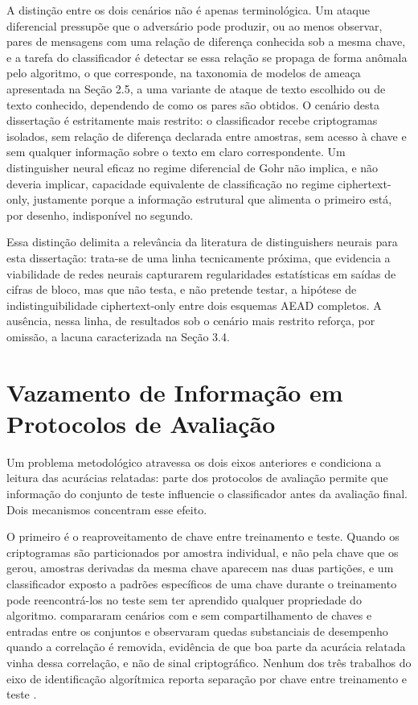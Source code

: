 A distinção entre os dois cenários não é apenas terminológica. Um ataque diferencial pressupõe que o adversário pode produzir, ou ao menos observar, pares de mensagens com uma relação de diferença conhecida sob a mesma chave, e a tarefa do classificador é detectar se essa relação se propaga de forma anômala pelo algoritmo, o que corresponde, na taxonomia de modelos de ameaça apresentada na Seção 2.5, a uma variante de ataque de texto escolhido ou de texto conhecido, dependendo de como os pares são obtidos. O cenário desta dissertação é estritamente mais restrito: o classificador recebe criptogramas isolados, sem relação de diferença declarada entre amostras, sem acesso à chave e sem qualquer informação sobre o texto em claro correspondente. Um distinguisher neural eficaz no regime diferencial de Gohr não implica, e não deveria implicar, capacidade equivalente de classificação no regime ciphertext-only, justamente porque a informação estrutural que alimenta o primeiro está, por desenho, indisponível no segundo.

Essa distinção delimita a relevância da literatura de distinguishers neurais para esta dissertação: trata-se de uma linha tecnicamente próxima, que evidencia a viabilidade de redes neurais capturarem regularidades estatísticas em saídas de cifras de bloco, mas que não testa, e não pretende testar, a hipótese de indistinguibilidade ciphertext-only entre dois esquemas AEAD completos. A ausência, nessa linha, de resultados sob o cenário mais restrito reforça, por omissão, a lacuna caracterizada na Seção 3.4.


\section{Vazamento de Informação em Protocolos de Avaliação}

Um problema metodológico atravessa os dois eixos anteriores e condiciona a leitura das acurácias relatadas: parte dos protocolos de avaliação permite que informação do conjunto de teste influencie o classificador antes da avaliação final. Dois mecanismos concentram esse efeito.

O primeiro é o reaproveitamento de chave entre treinamento e teste. Quando os criptogramas são particionados por amostra individual, e não pela chave que os gerou, amostras derivadas da mesma chave aparecem nas duas partições, e um classificador exposto a padrões específicos de uma chave durante o treinamento pode reencontrá-los no teste sem ter aprendido qualquer propriedade do algoritmo.  compararam cenários com e sem compartilhamento de chaves e entradas entre os conjuntos e observaram quedas substanciais de desempenho quando a correlação é removida, evidência de que boa parte da acurácia relatada vinha dessa correlação, e não de sinal criptográfico. Nenhum dos três trabalhos do eixo de identificação algorítmica reporta separação por chave entre treinamento e teste \cite{mello_xexeo_2018, yuan2022, sikdar_kule_2024}.

